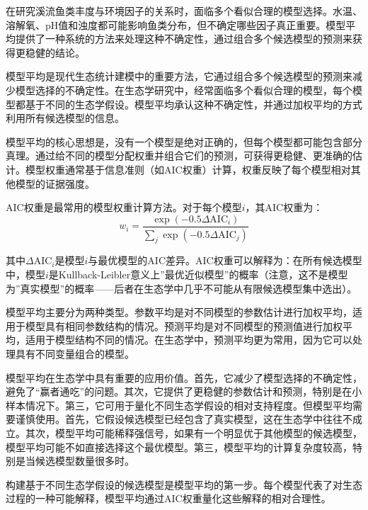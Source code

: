 \documentclass[
  twoside,12pt,fontset=none]{ctexbook}
\begin{document}
在研究溪流鱼类丰度与环境因子的关系时，面临多个看似合理的模型选择。水温、溶解氧、pH值和浊度都可能影响鱼类分布，但不确定哪些因子真正重要。模型平均提供了一种系统的方法来处理这种不确定性，通过组合多个候选模型的预测来获得更稳健的结论。

模型平均是现代生态统计建模中的重要方法，它通过组合多个候选模型的预测来减少模型选择的不确定性。在生态学研究中，经常面临多个看似合理的模型，每个模型都基于不同的生态学假设。模型平均承认这种不确定性，并通过加权平均的方式利用所有候选模型的信息。

模型平均的核心思想是，没有一个模型是绝对正确的，但每个模型都可能包含部分真理。通过给不同的模型分配权重并组合它们的预测，可获得更稳健、更准确的估计。模型权重通常基于信息准则（如\(\text{AIC}\)权重）计算，权重反映了每个模型相对其他模型的证据强度。

\(\text{AIC}\)权重是最常用的模型权重计算方法。对于每个模型\(i\)，其\(\text{AIC}\)权重为：
\[w_i = \frac{\exp(-0.5 \Delta\text{AIC}_i)}{\sum_j \exp(-0.5 \Delta\text{AIC}_j)}\]

其中\(\Delta\text{AIC}_i\)是模型\(i\)与最优模型的\(\text{AIC}\)差异。\(\text{AIC}\)权重可以解释为：在所有候选模型中，模型\(i\)是Kullback-Leibler意义上''最优近似模型''的概率（注意，这不是模型为''真实模型''的概率------后者在生态学中几乎不可能从有限候选模型集中选出）。

模型平均主要分为两种类型。参数平均是对不同模型的参数估计进行加权平均，适用于模型具有相同参数结构的情况。预测平均是对不同模型的预测值进行加权平均，适用于模型结构不同的情况。在生态学中，预测平均更为常用，因为它可以处理具有不同变量组合的模型。

模型平均在生态学中具有重要的应用价值。首先，它减少了模型选择的不确定性，避免了``赢者通吃''的问题。其次，它提供了更稳健的参数估计和预测，特别是在小样本情况下。第三，它可用于量化不同生态学假设的相对支持程度。但模型平均需要谨慎使用。首先，它假设候选模型已经包含了真实模型，这在生态学中往往不成立。其次，模型平均可能稀释强信号，如果有一个明显优于其他模型的候选模型，模型平均可能不如直接选择这个最优模型。第三，模型平均的计算复杂度较高，特别是当候选模型数量很多时。

构建基于不同生态学假设的候选模型是模型平均的第一步。每个模型代表了对生态过程的一种可能解释，模型平均通过AIC权重量化这些解释的相对合理性。
\end{document}
